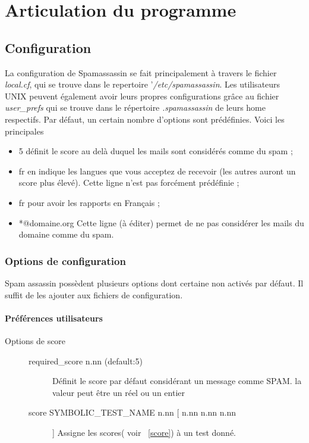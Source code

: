 \documentclass[a4paper,11pt]{article}
\begin{document}
\pagebreak

\section{Articulation du programme}

\subsection{Configuration}

La configuration de Spamassassin se fait principalement à travers le fichier \emph{local.cf}, qui se trouve dans le 
repertoire '\emph{/etc/spamassassin}.
Les utilisateurs UNIX peuvent également avoir leurs propres configurations grâce au fichier \emph{user\_prefs}
qui se trouve dans le répertoire \emph{.spamassassin} de leurs home respectifs. 
Par défaut, un certain nombre d’options sont prédéfinies. Voici les principales \begin{itemize}
 \item 5 définit le score au delà duquel les mails sont considérés comme du spam ;
 \item fr en indique les langues que vous acceptez de recevoir (les autres auront un score plus élevé). Cette ligne n’est pas forcément prédéfinie ;
 \item fr pour avoir les rapports en Français ;
 \item *@domaine.org Cette ligne (à éditer) permet de ne pas considérer les mails du domaine comme du spam.
\end{itemize}

\subsubsection{Options de configuration}

Spam assassin possèdent plusieurs options dont certaine non activés par défaut. Il suffit de les ajouter aux fichiers 
de configuration.

\paragraph{Préférences utilisateurs}

\begin{description}
 \item [Options de score] \begin{description}
                           \item [required\_score n.nn (default:5)] Définit le score par défaut considérant un message comme SPAM. la valeur peut être un réel ou un entier
                           \item [score SYMBOLIC\_TEST\_NAME n.nn [ n.nn n.nn n.nn ]] Assigne les scores( voir ~\ref{score}) à un test donné.
                          \end{description}


\end{description}



\appendix
\end{document}
